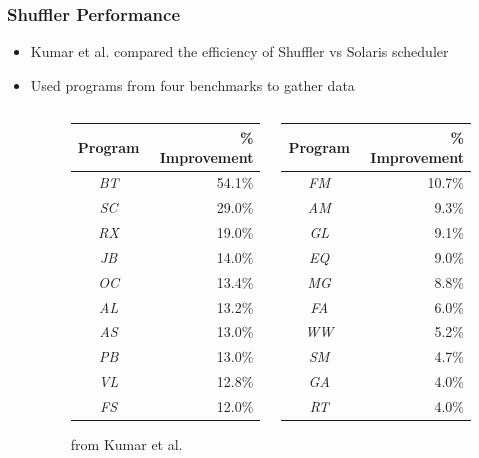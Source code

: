 \documentclass{beamer}
\begin{document}
\begin{frame}
\frametitle{Shuffler Performance}

\begin{itemize}
\item Kumar et al. compared the efficiency of Shuffler vs Solaris scheduler
\item Used programs from four benchmarks to gather data

\begin{figure}
\begin{columns}
\begin{column}{0.5\textwidth}
\begin{table}
	\centering
	\begin{tabular}{| c | r |}
	\hline
	\textbf{Program} & \textbf{\% Improvement} \\ \hline
	\emph{BT} & 54.1\% \\ \hline
		\emph{SC} & 29.0\% \\ \hline
		\emph{RX} & 19.0\% \\ \hline
		\emph{JB} & 14.0\% \\ \hline
		\emph{OC} & 13.4\% \\ \hline
		\emph{AL} & 13.2\% \\ \hline
		\emph{AS} & 13.0\% \\ \hline
		\emph{PB} & 13.0\% \\ \hline
		\emph{VL} & 12.8\% \\ \hline
		\emph{FS} & 12.0\% \\ \hline
\end{tabular}
\end{table}
\end{column}
\begin{column}{0.5\textwidth}

	\begin{table}
	\centering
	\begin{tabular}{| c | r |}
	\hline
	\textbf{Program} & \textbf{\% Improvement} \\ \hline
		\emph{FM} & 10.7\% \\ \hline
		\emph{AM} & 9.3\% \\ \hline
		\emph{GL} & 9.1\% \\ \hline
		\emph{EQ} & 9.0\% \\ \hline
		\emph{MG} & 8.8\% \\ \hline
		\emph{FA} & 6.0\% \\ \hline
		\emph{WW} & 5.2\% \\ \hline
		\emph{SM} & 4.7\% \\ \hline
		\emph{GA} & 4.0\% \\ \hline
		\emph{RT} & 4.0\% \\ \hline
\end{tabular}
\end{table}


\end{column}
\end{columns}
\caption*{from Kumar et al.~\cite{Kumar:2014}}
\end{figure}
 
\end{itemize}

\end{frame}
\end{document}
